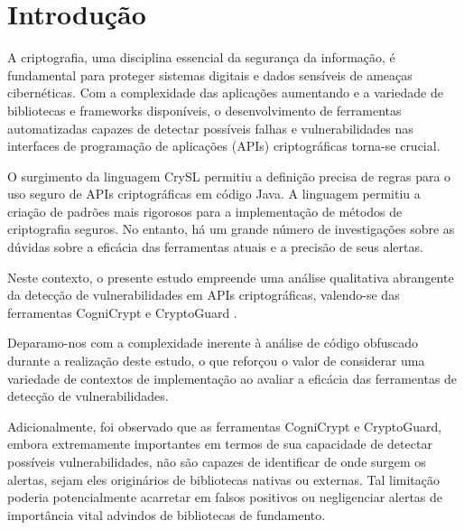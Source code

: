 

\section{Introdução}%

A criptografia, uma disciplina essencial da segurança da informação, é fundamental para proteger sistemas digitais e dados sensíveis de ameaças cibernéticas. \cite{what_is_cryptography} Com a complexidade das aplicações aumentando e a variedade de bibliotecas e frameworks disponíveis, o desenvolvimento de ferramentas automatizadas capazes de detectar possíveis falhas e vulnerabilidades nas interfaces de programação de aplicações (APIs) criptográficas torna-se crucial. \cite{api_misuses_zhang}

O surgimento da linguagem CrySL permitiu a definição precisa de regras para o uso seguro de APIs criptográficas em código Java. \cite{CogniCrypt} A linguagem permitiu a criação de padrões mais rigorosos para a implementação de métodos de criptografia seguros. No entanto, há um grande número de investigações sobre as dúvidas sobre a eficácia das ferramentas atuais e a precisão de seus alertas.

Neste contexto, o presente estudo empreende uma análise qualitativa abrangente da detecção de vulnerabilidades em APIs criptográficas, valendo-se das ferramentas CogniCrypt \cite{CogniCrypt} e CryptoGuard \cite{CryptoGuard}.

Deparamo-nos com a complexidade inerente à análise de código obfuscado durante a realização deste estudo, o que reforçou o valor de considerar uma variedade de contextos de implementação ao avaliar a eficácia das ferramentas de detecção de vulnerabilidades. \cite{api_tpl_zhang}

Adicionalmente, foi observado que as ferramentas CogniCrypt e CryptoGuard, embora extremamente importantes em termos de sua capacidade de detectar possíveis vulnerabilidades, não são capazes de identificar de onde surgem os alertas, sejam eles originários de bibliotecas nativas ou externas. \cite{perception_developers} Tal limitação poderia potencialmente acarretar em falsos positivos ou negligenciar alertas de importância vital advindos de bibliotecas de fundamento.

